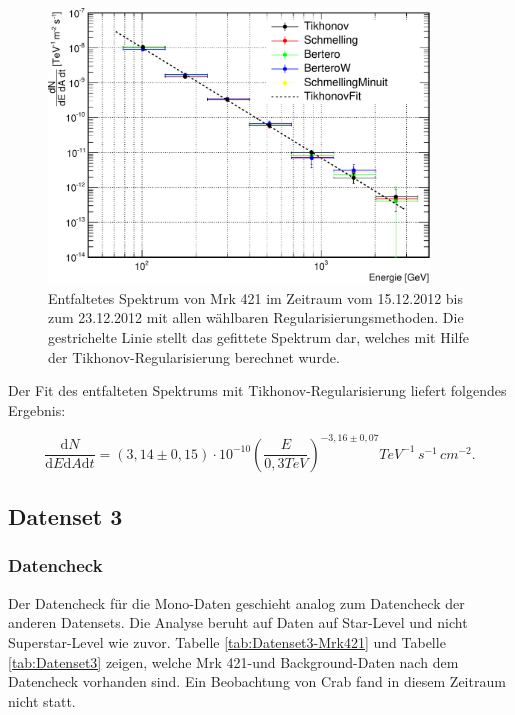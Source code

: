 \begin{figure}
    \centering
    \includegraphics[width=0.9\textwidth]{./Plots/04_MrkAnalyse/Datenset4/Datenset4_Spektrum_Mrk421.pdf}
    \caption{Entfaltetes Spektrum von Mrk 421 im Zeitraum vom 15.12.2012 bis zum 23.12.2012 mit allen wählbaren Regularisierungsmethoden.
    Die gestrichelte Linie stellt das gefittete Spektrum dar, welches mit Hilfe der Tikhonov-Regularisierung berechnet wurde.}
    \label{Datenset4_Spektrum_Mrk421}
\end{figure}

Der Fit des entfalteten Spektrums mit Tikhonov-Regularisierung liefert folgendes Ergebnis:

\begin{equation}
 \frac{\mathrm{d}N}{\mathrm{d}E\mathrm{d}A\mathrm{d}t}=(3,14 \pm 0,15) \cdot 10^{-10}\left( \frac{E}{0,3 \si{TeV}} \right)^{-3,16\pm 0,07} \si{TeV^{-1}\,s^{-1}\,cm^{-2}}.
\end{equation}


\FloatBarrier

\subsection{Datenset 3}
\label{subsec:Datenset_3}

\subsubsection{Datencheck}
Der Datencheck für die Mono-Daten geschieht analog zum Datencheck der anderen Datensets.
Die Analyse beruht auf Daten auf Star-Level und nicht Superstar-Level wie zuvor.
Tabelle \ref{tab:Datenset3-Mrk421} und Tabelle \ref{tab:Datenset3} zeigen, welche Mrk 421-und Background-Daten nach dem Datencheck vorhanden sind.
Ein Beobachtung von Crab fand in diesem Zeitraum nicht statt.

